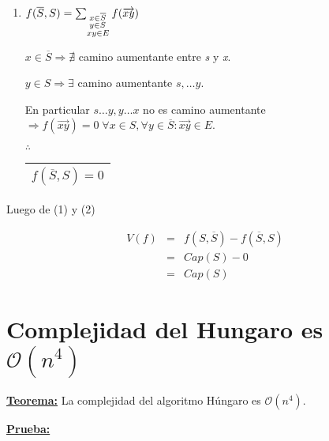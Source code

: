 \documentclass[12pt,a4paper]{report}
\begin{document}
\begin{enumerate}[(1)]
				\item $f(\overline{S}, S) = \sum_{\begin{subarray}{l} \; x \in \overline{S}\\
\; y \in S \\ xy \in E\end{subarray}} f(\overrightarrow{xy}) $

				$x \in \overline{S} \Rightarrow \nexists$ camino aumentante entre \textit{s} y \textit{x}.

				$y \in S \Rightarrow \exists$ camino aumentante $ s, \dotsc y$.
				
				En particular $s \dotsc y, y \dotsc x$ no es camino aumentante $\Rightarrow f(\overrightarrow{xy}) = 0  \; \forall x \in S, \forall y \in \overline{S} : \overrightarrow{xy} \in E$.
				
				\vspace{3mm}
				$\therefore$ \begin{tabular}{|c|} \hline $ f(\overline{S}, S) = 0 $ \\ \hline \end{tabular}
			\end{enumerate}
			
			Luego de (1) y (2)
			
			\begin{eqnarray}
				\nonumber V(f) &=& f(S, \overline{S}) - f(\overline{S}, S)\\
				\nonumber &=& Cap(S) - 0 \\
				\nonumber &=& Cap(S)				
			\end{eqnarray}

	\section{Complejidad del Hungaro es $\mathcal{O}(n^{4})$}
	
		\textbf{\underline{Teorema:}} La complejidad del algoritmo Húngaro es $\mathcal{O}(n^{4})$.
		
		\textbf{\underline{Prueba:}} 
		
\end{document}
